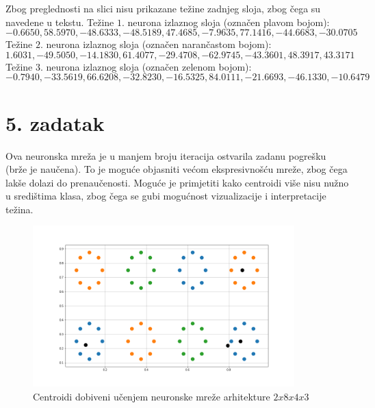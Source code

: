 \documentclass[12pt, a4paper, numeric]{article}
\begin{document}
Zbog preglednosti na slici nisu prikazane težine zadnjeg sloja, zbog čega su navedene u tekstu.
Težine $1.$ neurona izlaznog sloja (označen plavom bojom):
\[-0.6650, 58.5970, -48.6333, -48.5189, 47.4685, -7.9635, 77.1416, -44.6683, -30.0705\]
Težine $2.$ neurona izlaznog sloja (označen narančastom bojom):
\[1.6031, -49.5050, -14.1830, 61.4077, -29.4708, -62.9745, -43.3601, 48.3917, 43.3171\]
Težine $3.$ neurona izlaznog sloja (označen zelenom bojom):
\[-0.7940, -33.5619, 66.6208, -32.8230, -16.5325, 84.0111, -21.6693, -46.1330, -10.6479\]
\pagebreak



\section*{5. zadatak}
Ova neuronska mreža je u manjem broju iteracija ostvarila zadanu pogrešku (brže je naučena). 
To je moguće objasniti većom ekspresivnošću mreže, zbog čega lakše dolazi do prenaučenosti.
Moguće je primjetiti kako centroidi više nisu nužno u središtima klasa, zbog čega se gubi mogućnost vizualizacije i interpretacije težina.
\begin{figure}[ht!] 
    \centering
    \includegraphics[width=0.9\textwidth]{img/zadatak5}
    \captionsetup{justification=centering}
    \caption{Centroidi dobiveni učenjem neuronske mreže arhitekture $2x8x4x3$}
    \label{fig:zad5}
\end{figure}
\pagebreak
\end{document}
